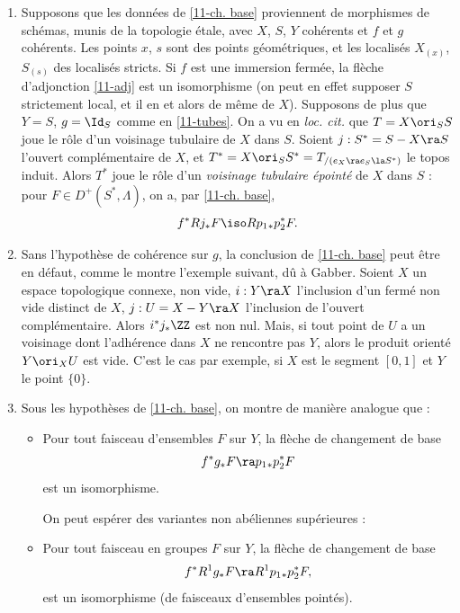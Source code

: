 \documentclass[10pt]{../fichiers-configuration-latex/smfart}
\begin{document}
\begin{remarques}\label{11-remarques}
\renewcommand{\theenumi}{(\arabic{enumi})}
\begin{enumerate}
\item Supposons que les données de \ref{11-ch. base} proviennent de morphismes de schémas, munis de la
topologie étale, avec $X$, $S$, $Y$ cohérents et $f$ et $g$ cohérents. Les points $x$, $s$ sont des
points géométriques, et les localisés $X_{(x)}$, $S_{(s)}$ des localisés stricts. Si $f$ est une
immersion fermée, la flèche d'adjonction \ref{11-adj} est un isomorphisme (on peut en effet supposer
$S$ strictement local, et il en et alors de même de $X$). Supposons de plus que $Y = S$, $g = \Id_S$
comme en \ref{11-tubes}. On a vu en \textit{loc. cit.} que $T = X \ori_S S$ joue le rôle d'un
voisinage tubulaire de $X$ dans $S$. Soient $j : S^*  = S - X \ra S$ l'ouvert complémentaire de $X$,
et $T^* = X \ori_S S^* = T_{/(e_X \ra e_S \la S^*)}$ le topos induit. Alors  $T^* $ joue le rôle
d'un \textit{voisinage tubulaire épointé} de $X$ dans $S$ : pour $F \in D^+(S^*,\Lambda)$, on a, par
\ref{11-ch. base}, $$ f^*Rj_*F \iso Rp_1{}_*p_2^*F.  $$

\item Sans l'hypothèse de cohérence sur $g$, la conclusion de \ref{11-ch. base} peut être en
défaut, comme le montre l'exemple suivant, dû à Gabber. Soient $X$ un espace topologique connexe,
non vide, $i : Y \ra X$ l'inclusion d'un fermé non vide distinct de $X$, $j : U= X - Y \ra X$
l'inclusion de l'ouvert complémentaire. Alors $i^*j_*\ZZ$ est non nul. Mais, si tout point de $U$ a
un voisinage dont l'adhérence dans $X$ ne rencontre pas $Y$, alors le produit orienté $Y \ori_X U$
est vide. C'est le cas par exemple, si $X$ est le segment $[0,1]$ et $Y$ le point $\{0\}$. 

\item Sous les hypothèses de \ref{11-ch. base}, on montre de manière analogue que :
\begin{itemize}

\item[(a)] Pour tout faisceau d'ensembles $F$ sur $Y$, la flèche de changement de base $$ f^*g_*F \ra
p_1{}_*p_2^*F $$ est un isomorphisme.

On peut espérer des variantes non abéliennes supérieures :

\item[(b)] Pour tout faisceau en groupes $F$ sur $Y$, la flèche de changement de base $$ f^*R^1g_*F \ra
R^1p_1{}_*p_2^*F, $$ est un isomorphisme (de faisceaux d'ensembles pointés).


\end{itemize}
\end{enumerate}
\end{remarques}
\end{document}
